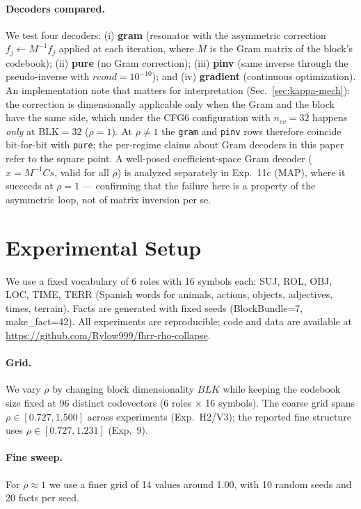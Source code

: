 \documentclass[11pt,a4paper]{article}
\begin{document}
\paragraph{Decoders compared.} We test four decoders: (i) \textbf{gram} (resonator with the asymmetric correction $f_j \leftarrow M^{-1} f_j$ applied at each iteration, where $M$ is the Gram matrix of the block's codebook); (ii) \textbf{pure} (no Gram correction); (iii) \textbf{pinv} (same inverse through the pseudo-inverse with $rcond=10^{-10}$); and (iv) \textbf{gradient} (continuous optimization). An implementation note that matters for interpretation (Sec.~\ref{sec:kappa-mech}): the correction is dimensionally applicable only when the Gram and the block have the same side, which under the CFG6 configuration with $n_{cv}=32$ happens \emph{only} at $\mathrm{BLK}=32$ ($\rho=1$). At $\rho \neq 1$ the \texttt{gram} and \texttt{pinv} rows therefore coincide bit-for-bit with \texttt{pure}; the per-regime claims about Gram decoders in this paper refer to the square point. A well-posed coefficient-space Gram decoder ($\hat{x} = M^{-1} C s$, valid for all $\rho$) is analyzed separately in Exp.~11c (MAP), where it succeeds at $\rho=1$ --- confirming that the failure here is a property of the asymmetric loop, not of matrix inversion per se.

\section{Experimental Setup}
\label{sec:setup}

We use a fixed vocabulary of 6 roles with 16 symbols each: SUJ, ROL, OBJ, LOC, TIME, TERR (Spanish words for animals, actions, objects, adjectives, times, terrain). Facts are generated with fixed seeds (BlockBundle=7, make\_fact=42). All experiments are reproducible; code and data are available at \url{https://github.com/Rylow999/fhrr-rho-collapse}.

\paragraph{Grid.} We vary $\rho$ by changing block dimensionality $BLK$ while keeping the codebook size fixed at 96 distinct codevectors (6 roles $\times$ 16 symbols). The coarse grid spans $\rho \in [0.727, 1.500]$ across experiments (Exp.~H2/V3); the reported fine structure uses $\rho \in [0.727, 1.231]$ (Exp.~9).

\paragraph{Fine sweep.} For $\rho \approx 1$ we use a finer grid of 14 values around 1.00, with 10 random seeds and 20 facts per seed.
\end{document}
